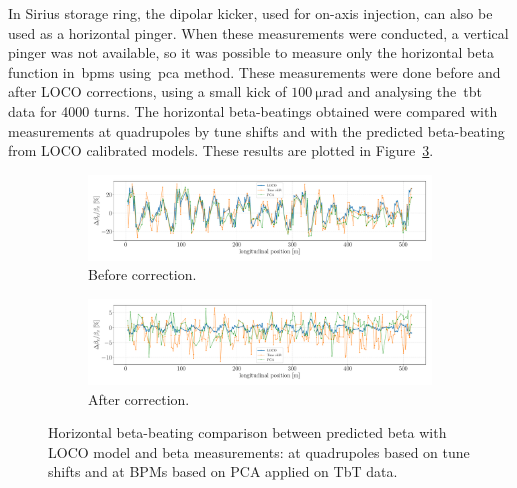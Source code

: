 In Sirius storage ring, the dipolar kicker, used for on-axis injection, can also be used as a horizontal pinger. When these measurements were conducted, a vertical pinger was not available, so it was possible to measure only the horizontal beta function in~\glspl{bpm} using~\gls{pca} method. These measurements were done before and after LOCO corrections, using a small kick of $\SI{100}{\micro\radian}$ and analysing the~\gls{tbt} data for 4000 turns. The horizontal beta-beatings obtained were compared with measurements at quadrupoles by tune shifts and with the predicted beta-beating from LOCO calibrated models. These results are plotted in Figure~\ref{fig:betax_compare}.
\begin{figure}
\centering
\begin{subfigure}[t]{1.0\textwidth}
\includegraphics[width=1.0\textwidth]{figures/betax_compare_loco_pca_quad_before_corr.pdf}
    \caption{Before correction.}
    \label{subfig:betax_compare_before}
\end{subfigure}
 \begin{subfigure}[t]{1.0\textwidth}
\includegraphics[width=1.0\textwidth]{figures/betax_compare_loco_pca_quad_after_corr.pdf}
    \caption{After correction.}
    \label{subfig:betax_compare_after}
\end{subfigure}
\caption{Horizontal beta-beating comparison between predicted beta with LOCO model and beta measurements: at quadrupoles based on tune shifts and at BPMs based on PCA applied on TbT data.}
\label{fig:betax_compare}
\end{figure}

